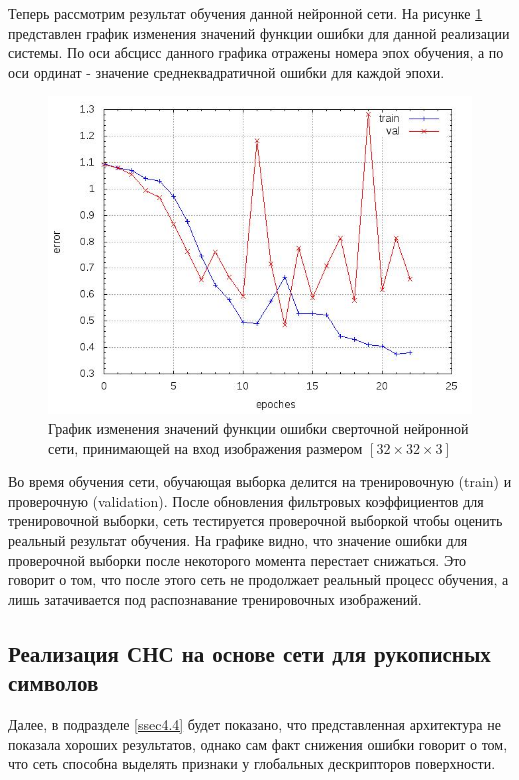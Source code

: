 \documentclass[14pt]{article}
\numberwithin{figure}{section}
\numberwithin{equation}{section}
\begin{document}
Теперь рассмотрим результат обучения данной нейронной сети. На рисунке \ref{ris:10} представлен график изменения значений функции ошибки для данной реализации системы. По оси абсцисс данного графика отражены номера эпох обучения, а по оси ординат - значение среднеквадратичной ошибки для каждой эпохи.

\begin{figure}[h]
   \begin{center}
       \includegraphics[scale=0.55] {10.JPG}
       \caption{График изменения значений функции ошибки сверточной нейронной сети, принимающей на вход изображения размером $[32 \times 32 \times 3]$}
       \label{ris:10}
   \end{center}
\end{figure}

Во время обучения сети, обучающая выборка делится на тренировочную (train) и проверочную (validation). После обновления фильтровых коэффициентов для тренировочной выборки, сеть тестируется проверочной выборкой чтобы оценить реальный результат обучения. На графике видно, что значение ошибки для проверочной выборки после некоторого момента перестает снижаться. Это говорит о том, что после этого сеть не продолжает реальный процесс обучения, а лишь затачивается под распознавание тренировочных изображений.

\subsection{Реализация СНС на основе сети для рукописных символов}\label{ssec4.3}

Далее, в подразделе \ref{ssec4.4} будет показано, что представленная архитектура не показала хороших результатов, однако сам факт снижения ошибки говорит о том, что сеть способна выделять признаки у глобальных дескрипторов поверхности.
\end{document}
